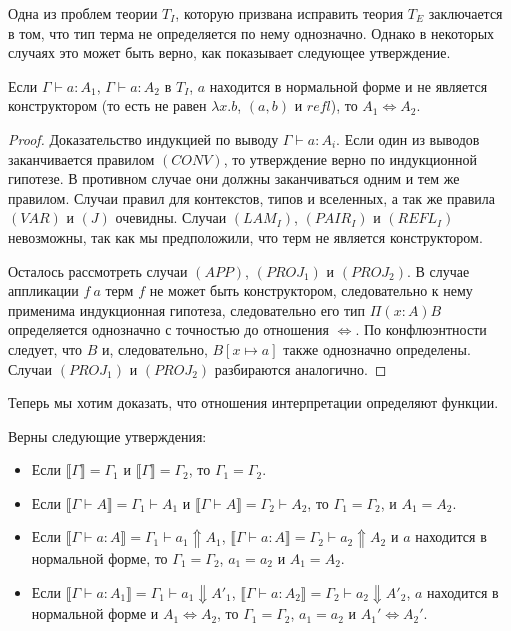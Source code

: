 \documentclass{amsart}
\theoremstyle{definition}
\theoremstyle{remark}
\newcommand{\deq}{\Leftrightarrow}
\renewcommand{\ll}{\llbracket}
\newcommand{\rr}{\rrbracket}
\numberwithin{figure}{section}
\begin{document}
Одна из проблем теории $T_I$, которую призвана исправить теория $T_E$ заключается в том, что тип терма не определяется по нему однозначно.
Однако в некоторых случаях это может быть верно, как показывает следующее утверждение.

\begin{prop}
Если $\Gamma \vdash a : A_1$, $\Gamma \vdash a : A_2$ в $T_I$, $a$ находится в нормальной форме и не является конструктором (то есть не равен $\lambda x. b$, $(a, b)$ и $refl$), то $A_1 \deq A_2$.
\end{prop}
\begin{proof}
Доказательство индукцией по выводу $\Gamma \vdash a : A_i$.
Если один из выводов заканчивается правилом $(CONV)$, то утверждение верно по индукционной гипотезе.
В противном случае они должны заканчиваться одним и тем же правилом.
Случаи правил для контекстов, типов и вселенных, а так же правила $(VAR)$ и $(J)$ очевидны.
Случаи $(LAM_I)$, $(PAIR_I)$ и $(REFL_I)$ невозможны, так как мы предположили, что терм не является конструктором.

Осталось рассмотреть случаи $(APP)$, $(PROJ_1)$ и $(PROJ_2)$.
В случае аппликации $f\ a$ терм $f$ не может быть конструктором, следовательно к нему применима индукционная гипотеза, следовательно его тип $\Pi (x : A) B$ определяется однозначно с точностью до отношения $\deq$.
По конфлюэнтности следует, что $B$ и, следовательно, $B[x \mapsto a]$ также однозначно определены.
Случаи $(PROJ_1)$ и $(PROJ_2)$ разбираются аналогично.
\end{proof}

Теперь мы хотим доказать, что отношения интерпретации определяют функции.
\begin{prop}
Верны следующие утверждения:
\begin{itemize}
\item Если $\ll \Gamma \rr = \Gamma_1$ и $\ll \Gamma \rr = \Gamma_2$, то $\Gamma_1 = \Gamma_2$.
\item Если $\ll \Gamma \vdash A \rr = \Gamma_1 \vdash A_1$ и $\ll \Gamma \vdash A \rr = \Gamma_2 \vdash A_2$, то $\Gamma_1 = \Gamma_2$, и $A_1 = A_2$.
\item Если $\ll \Gamma \vdash a : A \rr = \Gamma_1 \vdash a_1 \Uparrow A_1$, $\ll \Gamma \vdash a : A \rr = \Gamma_2 \vdash a_2 \Uparrow A_2$ и $a$ находится в нормальной форме, то $\Gamma_1 = \Gamma_2$, $a_1 = a_2$ и $A_1 = A_2$.
\item Если $\ll \Gamma \vdash a : A_1 \rr = \Gamma_1 \vdash a_1 \Downarrow A'_1$, $\ll \Gamma \vdash a : A_2 \rr = \Gamma_2 \vdash a_2 \Downarrow A'_2$, $a$ находится в нормальной форме и $A_1 \deq A_2$, то $\Gamma_1 = \Gamma_2$, $a_1 = a_2$ и $A_1' \deq A_2'$.
\end{itemize}
\end{prop}



\end{document}
